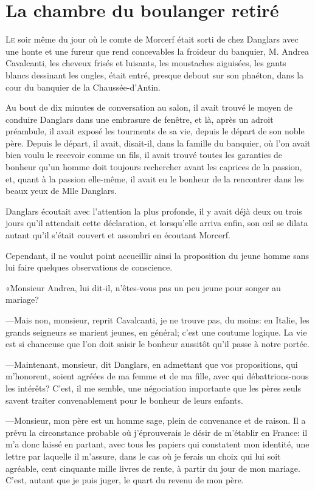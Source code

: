 \chapter{La chambre du boulanger retiré}

\lettrine{L}{e} soir même du jour où le comte de Morcerf était sorti de chez Danglars avec une honte et une fureur que rend concevables la froideur du banquier, M. Andrea Cavalcanti, les cheveux frisés et luisants, les moustaches aiguisées, les gants blancs dessinant les ongles, était entré, presque debout sur son phaéton, dans la cour du banquier de la Chaussée-d'Antin. 

Au bout de dix minutes de conversation au salon, il avait trouvé le moyen de conduire Danglars dans une embrasure de fenêtre, et là, après un adroit préambule, il avait exposé les tourments de sa vie, depuis le départ de son noble père. Depuis le départ, il avait, disait-il, dans la famille du banquier, où l'on avait bien voulu le recevoir comme un fils, il avait trouvé toutes les garanties de bonheur qu'un homme doit toujours rechercher avant les caprices de la passion, et, quant à la passion elle-même, il avait eu le bonheur de la rencontrer dans les beaux yeux de Mlle Danglars. 

Danglars écoutait avec l'attention la plus profonde, il y avait déjà deux ou trois jours qu'il attendait cette déclaration, et lorsqu'elle arriva enfin, son œil se dilata autant qu'il s'était couvert et assombri en écoutant Morcerf. 

Cependant, il ne voulut point accueillir ainsi la proposition du jeune homme sans lui faire quelques observations de conscience. 

«Monsieur Andrea, lui dit-il, n'êtes-vous pas un peu jeune pour songer au mariage? 

—Mais non, monsieur, reprit Cavalcanti, je ne trouve pas, du moins: en Italie, les grands seigneurs se marient jeunes, en général; c'est une coutume logique. La vie est si chanceuse que l'on doit saisir le bonheur aussitôt qu'il passe à notre portée. 

—Maintenant, monsieur, dit Danglars, en admettant que vos propositions, qui m'honorent, soient agréées de ma femme et de ma fille, avec qui débattrions-nous les intérêts? C'est, il me semble, une négociation importante que les pères seuls savent traiter convenablement pour le bonheur de leurs enfants. 

—Monsieur, mon père est un homme sage, plein de convenance et de raison. Il a prévu la circonstance probable où j'éprouverais le désir de m'établir en France: il m'a donc laissé en partant, avec tous les papiers qui constatent mon identité, une lettre par laquelle il m'assure, dans le cas où je ferais un choix qui lui soit agréable, cent cinquante mille livres de rente, à partir du jour de mon mariage. C'est, autant que je puis juger, le quart du revenu de mon père. 

